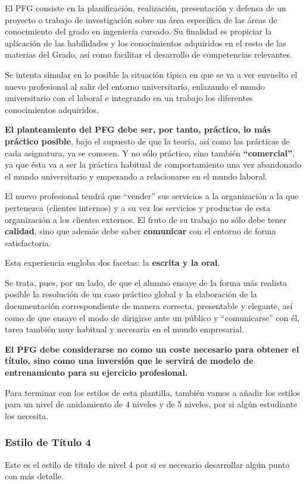 El PFG consiste en la planificación, realización, presentación y defensa de un proyecto o trabajo de investigación sobre un área específica de las áreas de conocimiento del grado en ingeniería cursado. Su finalidad es propiciar la aplicación de las habilidades y los conocimientos adquiridos en el resto de las materias del Grado, así como facilitar el desarrollo de competencias relevantes.

Se intenta simular en lo posible la situación típica en que se va a ver envuelto el nuevo profesional al salir del entorno universitario, enlazando el mundo universitario con el laboral e integrando en un trabajo los diferentes conocimientos adquiridos.

\textbf{El planteamiento del PFG debe ser, por tanto, práctico, lo más práctico posible}, bajo el supuesto de que la teoría, así como las prácticas de cada asignatura, ya se conocen. Y no sólo práctico, sino también \textbf{“comercial”}, ya que ésta va a ser la práctica habitual de comportamiento una vez abandonado el mundo universitario y empezando a relacionarse en el mundo laboral.

El nuevo profesional tendrá que “vender” sus servicios a la organización a la que pertenezca (clientes internos) y a su vez los servicios y productos de esta organización a los clientes externos. El fruto de su trabajo no sólo debe tener \textbf{calidad}, sino que además debe saber \textbf{comunicar} con el entorno de forma satisfactoria.

Esta experiencia engloba dos facetas: la \textbf{escrita y la oral}.

Se trata, pues, por un lado, de que el alumno ensaye de la forma más realista posible la resolución de un caso práctico global y la elaboración de la documentación correspondiente de manera correcta, presentable y elegante, así como de que ensaye el modo de dirigirse ante un público y “comunicarse” con él, tarea también muy habitual y necesaria en el mundo empresarial.


\textbf{El PFG debe considerarse no como un coste necesario para obtener el título, sino como una inversión que le servirá de modelo de entrenamiento para su ejercicio profesional.}

Para terminar con los estilos de esta plantilla, también vamos a añadir los estilos para un nivel de anidamiento de 4 niveles y de 5 niveles, por si algún estudiante los necesita.


\subsubsection{Estilo de Título 4}
Este es el estilo de título de nivel 4 por si es necesario desarrollar algún punto con más detalle.

